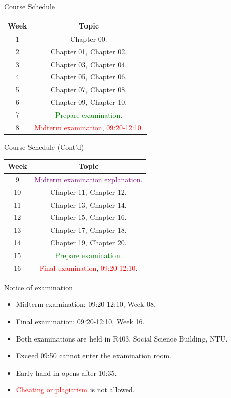 \documentclass{beamer}
\begin{document}
\begin{frame}{Course Schedule}
\begin{center}
\begin{tabular}{|c|c|}
\hline
Week & Topic \\
\hline
1 & Chapter 00.\\
\hline
2 & Chapter 01, Chapter 02.\\
\hline
3 & Chapter 03, Chapter 04.\\
\hline
4 & Chapter 05, Chapter 06.\\
\hline
5 & Chapter 07, Chapter 08.\\
\hline
6 & Chapter 09, Chapter 10.\\
\hline
7 & \textcolor{Green}{Prepare examination}.\\
\hline
8 & \textcolor{red}{Midterm examination}, \textcolor{red}{09:20-12:10}.\\
\hline
\end{tabular}
\end{center}
\end{frame}
\begin{frame}{Course Schedule (Cont'd)}
\begin{center}
\begin{tabular}{|c|c|}
\hline
Week & Topic \\
\hline
9 & \textcolor{purple}{Midterm examination explanation}.\\
\hline
10 & Chapter 11, Chapter 12.\\
\hline
11 & Chapter 13, Chapter 14.\\
\hline
12 & Chapter 15, Chapter 16.\\
\hline
13 & Chapter 17, Chapter 18.\\
\hline
14 & Chapter 19, Chapter 20.\\
\hline
15 & \textcolor{Green}{Prepare examination}.\\
\hline
16 & \textcolor{red}{Final examination}, \textcolor{red}{09:20-12:10}.\\
\hline
\end{tabular}
\end{center}
\end{frame}
\begin{frame}{Notice of examination}
\begin{itemize}
\item Midterm examination: 09:20-12:10, Week 08.
\item Final examination: 09:20-12:10, Week 16.
\item Both examinations are held in R403, Social Science Building, NTU.
\item Exceed 09:50 cannot enter the examination room.
\item Early hand in opens after 10:35.
\item \textcolor{red}{Cheating or plagiarism} is not allowed.
\end{itemize}
\end{frame}
\end{document}
